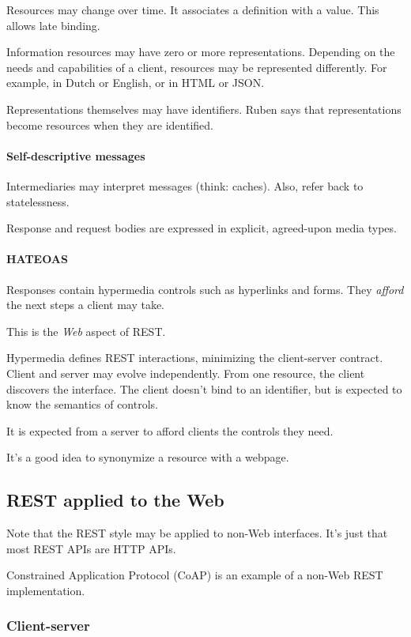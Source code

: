 \documentclass{report}
\begin{document}
Resources may change over time.
It associates a definition with a value.
This allows late binding.

Information resources may have zero or more representations.
Depending on the needs and capabilities of a client,
resources may be represented differently.
For example, in Dutch or English, or in HTML or JSON.

Representations themselves may have identifiers.
Ruben says that representations become resources
when they are identified.

\paragraph{Self-descriptive messages}

Intermediaries may interpret messages (think: caches).
Also, refer back to statelessness.

Response and request bodies are expressed
in explicit, agreed-upon media types.

\paragraph{HATEOAS}

Responses contain hypermedia controls such as hyperlinks and forms.
They \emph{afford} the next steps a client may take.

This is the \emph{Web} aspect of REST.

Hypermedia defines REST interactions,
minimizing the client-server contract.
Client and server may evolve independently.
From one resource, the client discovers the interface.
The client doesn't bind to an identifier,
but is expected to know the semantics of controls.

It is expected from a server to afford
clients the controls they need.

It's a good idea to synonymize a resource with a webpage.

\subsection{REST applied to the Web}

Note that the REST style may be applied to non-Web interfaces.
It's just that most REST APIs are HTTP APIs.

Constrained Application Protocol (CoAP) is an example
of a non-Web REST implementation.

\subsubsection{Client-server}
\end{document}
